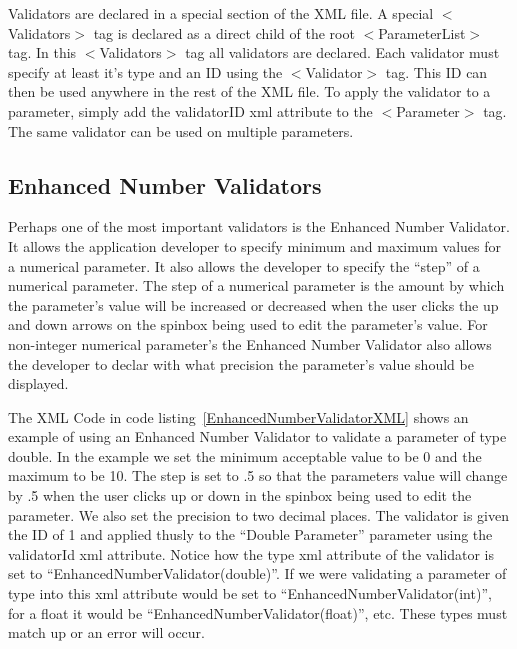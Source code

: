 Validators are declared in a special section of the XML file. A special $<$Validators$>$ tag is declared as a direct child
of the root $<$ParameterList$>$ tag. In this $<$Validators$>$ tag all validators are declared. Each validator must specify at
least it's type and an ID using the $<$Validator$>$ tag. This ID can then be used anywhere in the rest of the XML file. 
To apply the validator to a parameter, simply add the validatorID xml attribute to the $<$Parameter$>$ tag. The same validator 
can be used on multiple parameters.

\subsection{Enhanced Number Validators}
Perhaps one of the most important validators is the Enhanced Number Validator. It allows the application developer
to specify minimum and maximum values for a numerical parameter. It also allows the developer to specify the
``step'' of a numerical parameter. The step of a numerical parameter is the amount by which the parameter's value
will be increased or decreased when the user clicks the up and down arrows on the spinbox being used to edit
the parameter's value. For non-integer numerical parameter's the Enhanced Number Validator also allows the
developer to declar with what precision the parameter's value should be displayed.

The XML Code in code listing~\ref{EnhancedNumberValidatorXML} shows an example of using an Enhanced Number Validator
to validate a parameter of type double. In the example we set the minimum acceptable value to be 0 and the 
maximum to be 10. The step is set to .5 so that the parameters value will change by .5 when the user clicks
up or down in the spinbox being used to edit the parameter. We also set the precision to two decimal places.
The validator is given the ID of 1 and applied thusly to the ``Double Parameter'' parameter using the validatorId
xml attribute. Notice how the type xml attribute of the validator is set to ``EnhancedNumberValidator(double)''. If we 
were validating a parameter of type into this xml attribute would be set to ``EnhancedNumberValidator(int)'', 
for a float it would be ``EnhancedNumberValidator(float)'', etc. These types must match up or an error will
occur.

